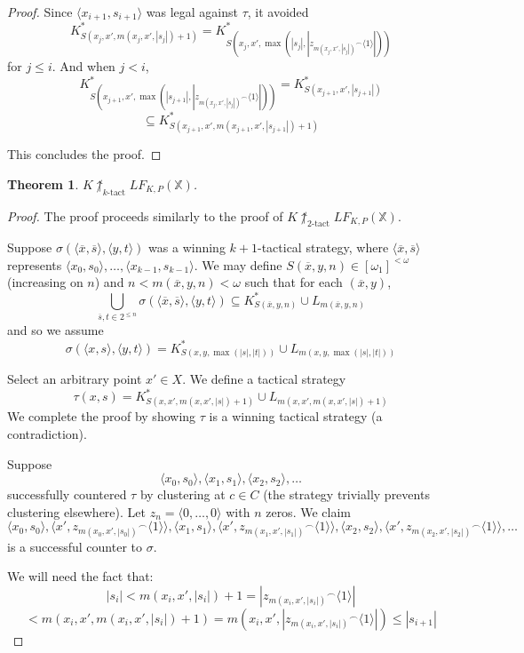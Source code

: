 \documentclass[11pt]{article}
\theoremstyle{plain}
\newtheorem{theorem}{Theorem}
\theoremstyle{definition}
\theoremstyle{remark}
\newcommand{\ktactwin}[1]{\uparrow_{#1\text{-tact}}}
\newcommand{\lfkpgame}[1]{LF_{K,P}(#1)}
\newcommand{\<}{\langle}
\renewcommand{\>}{\rangle}
\begin{document}
\begin{proof}
Since $\<x_{i+1},s_{i+1}\>$ was legal against $\tau$, it avoided
  \[
    K^*_{S(x_j,x',m(x_j,x',|s_j|)+1)} = 
    K^*_{S(x_j,x',\max(|s_j|,|{z_{m(x_j,x',|s_j|)}}^\frown\<1\>|))}
  \]
for $j\leq i$. And when $j<i$,
  \[
    K^*_{S(x_{j+1},x',\max(|s_{j+1}|,|{z_{m(x_j,x',|s_j|)}}^\frown\<1\>|))} =
    K^*_{S(x_{j+1},x',|s_{j+1}|)}
  \]
  \[
    \subseteq
    K^*_{S(x_{j+1},x',m(x_{j+1},x',|s_{j+1}|)+1)}
  \]

This concludes the proof.
\end{proof}

\begin{theorem}
$K\not\ktactwin{k}\lfkpgame{\mathbb{X}}$.
\end{theorem}

\begin{proof}
The proof proceeds similarly to the proof of $K\not\ktactwin{2}\lfkpgame{\mathbb{X}}$.

Suppose $\sigma(\<\overline{x},\overline{s}\>,\<y,t\>)$ was a winning $k+1$-tactical strategy, where $\<\overline{x},\overline{s}\>$ represents $\<x_0,s_0\>,\dots,\<x_{k-1},s_{k-1}\>$. We may define $S(\overline{x},y,n)\in [\omega_1]^{<\omega}$ (increasing on $n$) and $n<m(\overline{x},y,n)<\omega$ such that for each $(\overline{x},y)$,
  \[
    \bigcup_{\overline{s},t \in 2^{\leq n}} \sigma(\<\overline{x},\overline{s}\>,\<y,t\>) \subseteq 
    K^*_{S(\overline{x},y,n)} \cup L_{m(\overline{x},y,n)}
  \]
and so we assume
  \[
    \sigma(\<x,s\>,\<y,t\>) =
    K^*_{S(x,y,\max(|s|,|t|))} \cup L_{m(x,y,\max(|s|,|t|))}
  \]

Select an arbitrary point $x' \in X$. We define a tactical strategy 
  \[
  \tau(x,s) = 
  K^*_{S(x,x',m(x,x',|s|)+1)} \cup L_{m(x,x',m(x,x',|s|)+1)}
  \]
We complete the proof by showing $\tau$ is a winning tactical strategy (a contradiction).

Suppose
\[
\<x_0, s_0\>, \<x_1, s_1\>, \<x_2, s_2\>, \dots
\]
successfully countered $\tau$ by clustering at $c\in C$ (the strategy trivially prevents clustering elsewhere). Let $z_n = \<0,\dots,0\>$ with $n$ zeros. We claim
\[
\<x_0, s_0\>, \<x', {z_{m(x_0,x',|s_0|)}}^\frown\<1\>\>, \<x_1, s_1\>, \<x', {z_{m(x_1,x',|s_1|)}}^\frown\<1\>\>,  \<x_2, s_2\>, \<x', {z_{m(x_2,x',|s_2|)}}^\frown\<1\>\>, \dots
\]
is a successful counter to $\sigma$.

We will need the fact that:
  \[
    |s_i| <
    m(x_i,x',|s_i|)+1 =
    |{z_{m(x_i,x',|s_i|)}}^\frown\<1\>| 
  \]
  \[
    <
    m(x_i,x',m(x_i,x',|s_i|)+1) =
    m(x_i,x',|{z_{m(x_i,x',|s_i|)}}^\frown\<1\>|) \leq
    |s_{i+1}|
  \]


\end{proof}
\end{document}
